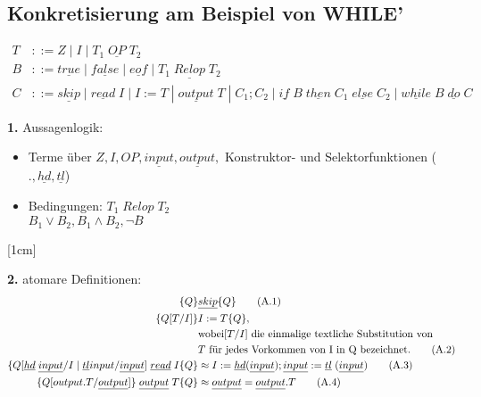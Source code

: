 \subsection{Konkretisierung am Beispiel von WHILE'}
\begin{align*}
T&::= Z\; |\; I\; |\; T_1\; \underline{OP}\; T_2\\
B&::= \underline{true}\; |\; \underline{false}\; |\; \underline{eof}\; |\; T_1\; \underline{Relop}\; T_2\\
C&::= \underline{skip}\; |\; \underline{read}\; I\; |\; I:=T\; |\; \underline{output}\; T\; |\; C_1;C_2\; |\; \underline{if}\;B\;\underline{then}\;C_1\;\underline{else}\;C_2\;|\;\underline{while}\;B\;\underline{do}\;C
\end{align*}
\begin{compactitem}
	\item[\textbf{1.}] Aussagenlogik:
	\begin{itemize}
		\item Terme über $Z, I, OP, \underline{input}, \underline{output},$ Konstruktor- und Selektorfunktionen ($., \underline{hd}, \underline{tl}$)
		\item Bedingungen: $T_1\;\underline{Relop}\;T_2$\\
		$B_1 \lor B_2, B_1 \land B_2, \lnot B$ 
	\end{itemize}
\newpage
{}[1cm]
	\item[\textbf{2.}] atomare Definitionen:\\
		\begin{align}
			\{Q\}&\underline{skip}\{Q\}\tag{A.1}\\
			\{Q[T/I]\}&I:=T\{Q\},\notag\\&\text{wobei}[T/I]\text{ die einmalige textliche Substitution von} \notag\\&T \text{ für jedes Vorkommen von I in Q bezeichnet.}\tag{A.2}\\
			\{Q[\underline{hd} \; \underline{input}/I\; |\; \underline{tl} input / \underline{input}]\;\underline{read}\; I \{Q\} &\approx I:= \underline{hd}(\underline{
			input}); \underline{input} := \underline{tl}\; (\underline{input}) \tag{A.3}\\
			\{Q[output.T / \underline{output}]\}\;\underline{output}\;T \{Q\} &\approx \underline{output}=\underline{output}.T\tag{A.4}\\
			\notag
		\end{align}

\end{compactitem}
